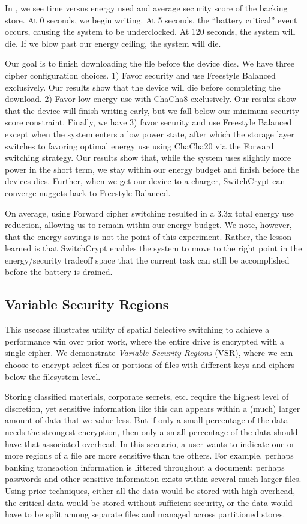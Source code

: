In , we see time versus energy used and average security
score of the backing store. At 0 seconds, we begin writing. At 5 seconds, the
``battery critical'' event occurs, causing the system to be underclocked. At 120
seconds, the system will die. If we blow past our energy ceiling, the system
will die.

Our goal is to finish downloading the file before the device dies. We have three
cipher configuration choices. 1) Favor security and use Freestyle Balanced
exclusively. Our results show that the device will die before completing the
download. 2) Favor low energy use with ChaCha8 exclusively. Our results show
that the device will finish writing early, but we fall below our minimum
security score constraint. Finally, we have 3) favor security and use Freestyle
Balanced except when the system enters a low power state, after which the
storage layer switches to favoring optimal energy use using ChaCha20 via the
Forward switching strategy. Our results show that, while the system uses
slightly more power in the short term, we stay within our energy budget and
finish before the devices dies. Further, when we get our device to a charger,
SwitchCrypt can converge nuggets back to Freestyle Balanced.

On average, using Forward cipher switching resulted in a 3.3x total energy use
reduction, allowing us to remain within our energy budget. We note, however,
that the energy savings is not the point of this experiment. Rather, the lesson
learned is that SwitchCrypt enables the system to move to the right point in the
energy/security tradeoff space that the current task can still be accomplished
before the battery is drained.

\subsection{Variable Security Regions}\label{subsec:uc2}

This usecase illustrates utility of spatial Selective switching to achieve a
performance win over prior work, where the entire drive is encrypted with a
single cipher. We demonstrate \emph{Variable Security Regions} (VSR), where we
can choose to encrypt select files or portions of files with different keys and
ciphers below the filesystem level.

Storing classified materials, corporate secrets, etc. require the highest level
of discretion, yet sensitive information like this can appears within a (much)
larger amount of data that we value less. But if only a small percentage of the
data needs the strongest encryption, then only a small percentage of the data
should have that associated overhead. In this scenario, a user wants to indicate
one or more regions of a file are more sensitive than the others. For example,
perhaps banking transaction information is littered throughout a document;
perhaps passwords and other sensitive information exists within several much
larger files. Using prior techniques, either all the data would be stored with
high overhead, the critical data would be stored without sufficient security, or
the data would have to be split among separate files and managed across
partitioned stores.

